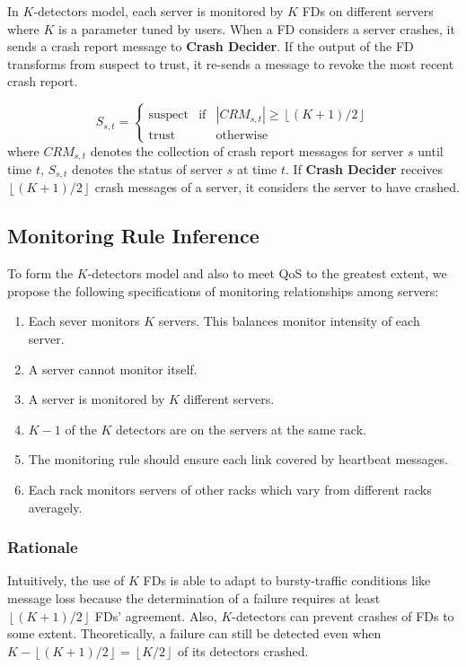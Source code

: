 \documentclass{sig-alternate-05-2015}
\begin{document}
In $K$-detectors model, each server is monitored by $K$ FDs on different servers where $K$ is a parameter tuned by users. When a FD considers a server crashes, it sends a crash report message to \textbf{Crash Decider}. If the output of the FD transforms from suspect to trust, it re-sends a message to revoke the most recent crash report.

\begin{equation}
S_{s,t}=\left\{
    \begin{array}{lcl}
    \text{suspect} & \text{if} & |CRM_{s,t}|\geq\left\lfloor(K+1)/2\right\rfloor \\

    \text{trust} && \text{otherwise}
    \end{array}
\right.
\end{equation}
where $CRM_{s,t}$ denotes the collection of crash report messages for server $s$ until time $t$, $S_{s,t}$ denotes the status of server $s$ at time $t$. If \textbf{Crash Decider} receives $\left\lfloor(K+1)/2\right\rfloor$ crash messages of a server, it considers the server to have crashed.

\subsection{Monitoring Rule Inference}
To form the $K$-detectors model and also to meet QoS to the greatest extent, we propose the following specifications of monitoring relationships among servers:
\begin{enumerate}
    \item Each sever monitors $K$ servers. This balances monitor intensity of each server.
    \item A server cannot monitor itself.
    \item A server is monitored by $K$ different servers.
    \item $K-1$ of the $K$ detectors are on the servers at the same rack.
    \item The monitoring rule should ensure each link covered by heartbeat messages.
    \item Each rack monitors servers of other racks which vary from different racks averagely.
\end{enumerate}

\subsubsection*{Rationale}
\quad Intuitively, the use of $K$ FDs is able to adapt to bursty-traffic conditions like message loss because the determination of a failure requires at least $\left\lfloor(K+1)/2\right\rfloor$ FDs' agreement. Also, $K$-detectors can prevent crashes of FDs to some extent. Theoretically, a failure can still be detected even when $K-\left\lfloor(K+1)/2\right\rfloor=\left\lfloor K/2\right\rfloor$ of its detectors crashed.
\end{document}
